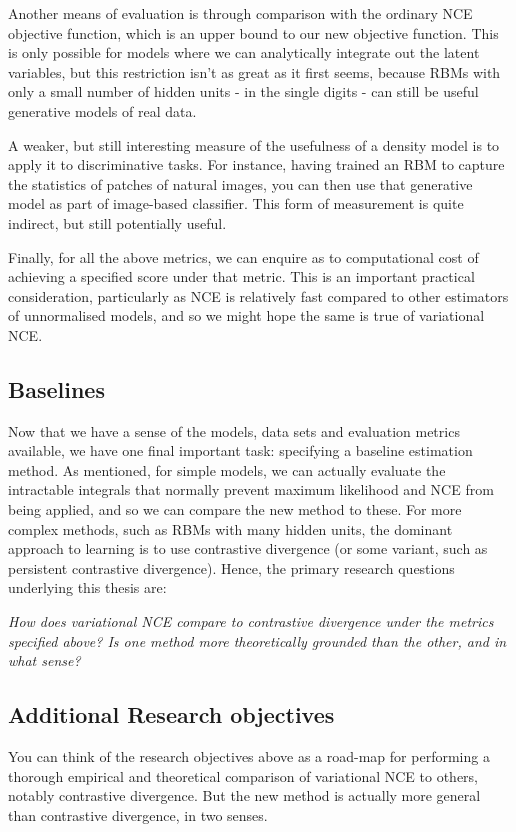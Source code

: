 \documentclass[11pt, oneside]{article}
\begin{document}
Another means of evaluation is through comparison with the ordinary NCE objective function, which is an upper bound to our new objective function. This is only possible for models where we can analytically integrate out the latent variables, but this restriction isn't as great as it first seems, because RBMs with only a small number of hidden units - in the single digits - can still be useful generative models of real data.

A weaker, but still interesting measure of the usefulness of a density model is to apply it to discriminative tasks. For instance, having trained an RBM to capture the statistics of patches of natural images, you can then use that generative model as part of image-based classifier. This form of measurement is quite indirect, but still potentially useful. 

Finally, for all the above metrics, we can enquire as to computational cost of achieving a specified score under that metric. This is an important practical consideration, particularly as NCE is relatively fast compared to other estimators of unnormalised models, and so we might hope the same is true of variational NCE.

\subsection{Baselines}
\label{sec: baselines}
Now that we have a sense of the models, data sets and evaluation metrics available, we have one final important task: specifying a baseline estimation method. As mentioned, for simple models, we can actually evaluate the intractable integrals that normally prevent maximum likelihood and NCE from being applied, and so we can compare the new method to these. For more complex methods, such as RBMs with many hidden units, the dominant approach to learning is to use contrastive divergence (or some variant, such as persistent contrastive divergence). Hence, the primary research questions underlying this thesis are: 

\vspace{2mm}
\noindent \emph{How does variational NCE compare to contrastive divergence under the metrics specified above? Is one method more theoretically grounded than the other, and in what sense?}

\subsection{Additional Research objectives}
You can think of the research objectives above as a road-map for performing a thorough empirical and theoretical comparison of variational NCE to others, notably contrastive divergence. But the new method is actually more general than contrastive divergence, in two senses.
\end{document}

